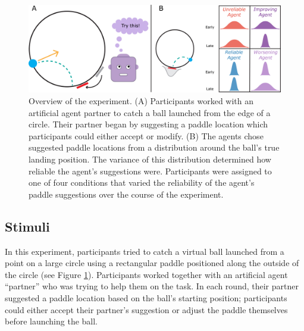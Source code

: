 \documentclass[10pt,letterpaper]{article}
\begin{document}
\begin{figure}[hbtp]
\vspace{-8mm}
\includegraphics[width=\textwidth]{img/expt_overview.jpg} 
\vspace{-4mm}
\caption{Overview of the experiment. (A) Participants worked with an artificial agent partner to catch a ball launched from the edge of a circle. Their partner began by suggesting a paddle location which participants could either accept or modify. (B) The agents chose suggested paddle locations from a distribution around the ball's true landing position. The variance of this distribution determined how reliable the agent's suggestions were. Participants were assigned to one of four conditions that varied the reliability of the agent's paddle suggestions over the course of the experiment.} 
\label{fig:stimuli}
\end{figure}




\subsection{Stimuli}
In this experiment, participants tried to catch a virtual ball launched from a point on a large circle using a rectangular paddle positioned along the outside of the circle (see Figure \ref{fig:stimuli}).\footnotemark{} 
Participants worked together with an artificial agent ``partner'' who was trying to help them on the task. In each round, their partner suggested a paddle location based on the ball's starting position; participants could either accept their partner's suggestion or adjust the paddle themselves before launching the ball.

\end{document}
